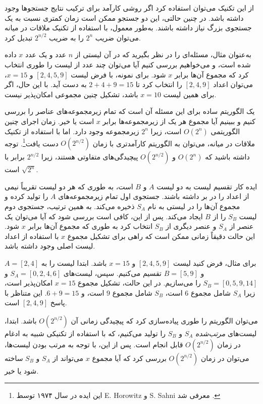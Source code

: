 از این تکنیک می‌توان استفاده کرد
اگر روشی کارآمد برای ترکیب
نتایج جستجوها وجود داشته باشد.
در چنین حالتی، این دو جستجو ممکن است زمان کمتری
نسبت به یک جستجوی بزرگ نیاز داشته باشند.
به‌طور معمول، با استفاده از تکنیک ملاقات در میانه
می‌توان ضریب $2^n$ را
به ضریب $2^{n/2}$ تبدیل کرد.

به‌عنوان مثال، مسئله‌ای را در نظر بگیرید که در آن
لیستی از $n$ عدد و
یک عدد $x$ داده شده است،
و می‌خواهیم بررسی کنیم آیا می‌توان
چند عدد از لیست را طوری انتخاب کرد که
مجموع آن‌ها برابر $x$ شود.
برای نمونه، با فرض لیست $[2,4,5,9]$ و $x=15$،
می‌توان اعداد $[2,4,9]$ را انتخاب کرد تا $2+4+9=15$ به دست آید.
با این حال، اگر برای همین لیست $x=10$ باشد،
تشکیل چنین مجموعی امکان‌پذیر نیست.

یک الگوریتم ساده برای این مسئله آن است که
تمام زیرمجموعه‌های عناصر را بررسی کنیم و
ببینیم آیا مجموع هر یک از زیرمجموعه‌ها برابر $x$ است یا خیر.
زمان اجرای چنین الگوریتمی $O(2^n)$ است،
زیرا $2^n$ زیرمجموعه وجود دارد.
اما با استفاده از تکنیک ملاقات در میانه،
می‌توان به الگوریتم کارآمدتری با زمان $O(2^{n/2})$ دست یافت\footnote{این
ایده در سال ۱۹۷۴ توسط E. Horowitz و S. Sahni معرفی شد \cite{hor74}.}.
توجه داشته باشید که $O(2^n)$ و $O(2^{n/2})$ پیچیدگی‌های متفاوتی
هستند، زیرا $2^{n/2}$ برابر با $\sqrt{2^n}$ است.

ایده کار تقسیم لیست به
دو لیست $A$ و $B$ است، به طوری که هر دو
لیست تقریباً نیمی از اعداد را در بر داشته باشند.
جستجوی اول تمام زیرمجموعه‌های
$A$ را تولید کرده و مجموع آن‌ها را در لیستی به نام $S_A$ ذخیره می‌کند.
به همین ترتیب، جستجوی دوم
لیست $S_B$ را از $B$ ایجاد می‌کند.
پس از این، کافی است بررسی شود که آیا می‌توان
یک عنصر از $S_A$ و عنصر دیگری
از $S_B$ انتخاب کرد به طوری که مجموع آن‌ها برابر $x$ شود.
این حالت دقیقاً زمانی ممکن است که راهی برای
تشکیل مجموع $x$ با استفاده از اعداد لیست اصلی وجود داشته باشد.

برای مثال، فرض کنید لیست $[2,4,5,9]$ و $x=15$ باشد.
ابتدا لیست را به $A=[2,4]$ و $B=[5,9]$ تقسیم می‌کنیم.
سپس، لیست‌های
$S_A=[0,2,4,6]$ و $S_B=[0,5,9,14]$ را می‌سازیم.
در این حالت، تشکیل مجموع $x=15$ امکان‌پذیر است،
زیرا $S_A$ شامل مجموع $6$ است،
$S_B$ شامل مجموع $9$ است، و $6+9=15$.
این متناظر با پاسخ $[2,4,9]$ است.

می‌توان الگوریتم را طوری پیاده‌سازی کرد که
پیچیدگی زمانی آن $O(2^{n/2})$ باشد.
ابتدا، لیست‌های \emph{مرتب‌شده} $S_A$ و $S_B$ را تولید می‌کنیم،
که با استفاده از تکنیکی شبیه به ادغام در زمان $O(2^{n/2})$ قابل انجام است.
پس از این، با توجه به مرتب بودن لیست‌ها،
می‌توان در زمان $O(2^{n/2})$ بررسی کرد که آیا
مجموع $x$ می‌تواند از $S_A$ و $S_B$ ساخته شود یا خیر.